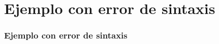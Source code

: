 \section{Ejemplo con error de sintaxis}

\begin{frame}
\frametitle{Ejemplo con error de sintaxis}



\end{frame}
